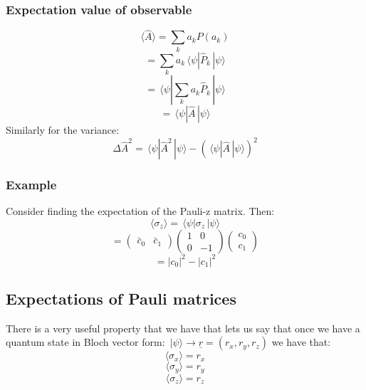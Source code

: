 \documentclass[12pt]{article}
\newcommand{\ket}[1]{\,|#1\rangle}
\newcommand{\bra}[1]{\,\langle #1|}
\begin{document}
\subsubsection*{Expectation value of observable}
\[\langle\hat{A}\rangle=\sum_ka_kP(a_k)\]
\[=\sum_ka_k\bra{\psi}\hat{P}_k\ket{\psi}\]
\[=\bra{\psi}\sum_ka_k\hat{P}_k\ket{\psi}\]
\[=\bra{\psi}\hat{A}\ket{\psi}\]
Similarly for the variance:
\[\Delta\hat{A}^2=\bra{\psi}\hat{A}^2\ket{\psi}-(\bra{\psi}\hat{A}\ket{\psi})^2\]
\subsubsection*{Example}
Consider finding the expectation of the Pauli-z matrix. Then:
\[\langle\sigma_z\rangle =\bra{\psi} \sigma_z\ket{\psi}\]
\[=\begin{pmatrix}
    \bar{c}_0 & \bar{c}_1
\end{pmatrix}\begin{pmatrix}
    1 & 0 \\
    0 & -1
\end{pmatrix}\begin{pmatrix}
    c_0 \\
    c_1
\end{pmatrix}\]
\[=|c_0|^2-|c_1|^2\]
\subsection*{Expectations of Pauli matrices}
There is a very useful property that we have that lets us say that once we have a quantum state in Bloch vector form: \(\ket{\psi}\to\underline{r}=(r_x,r_y,r_z)\) we have that:
\[\langle\sigma_x\rangle =r_x\]
\[\langle \sigma_y\rangle= r_y\]
\[\langle \sigma_z\rangle =r_z\]
\end{document}
